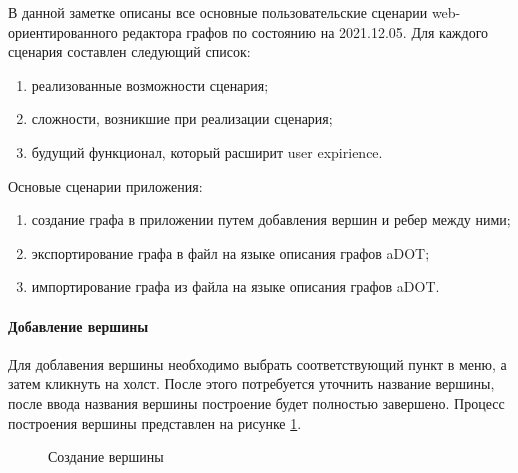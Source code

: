 \def\notedate{2021.12.05}
\def\currentauthor{Ершов В. (РК6-72Б)}

В данной заметке описаны все основные пользовательские сценарии web-ориентированного редактора графов по состоянию на 2021.12.05. Для каждого сценария составлен следующий список:
\begin{enumerate}[label=\arabic*)]
	\item реализованные возможности сценария;
	\item сложности, возникшие при реализации сценария;
	\item будущий функционал, который расширит user expirience.
\end{enumerate}

Основые сценарии приложения:
\begin{enumerate}[label=\arabic*)]
	\item создание графа в приложении путем добавления вершин и ребер между ними;
	\item экспортирование графа в файл на языке описания графов aDOT;
	\item импортирование графа из файла на языке описания графов aDOT.
\end{enumerate}

\paragraph{Добавление вершины}

Для доблавения вершины необходимо выбрать соответствующий пункт в меню, а затем кликнуть на холст.
После этого потребуется уточнить название вершины, после ввода названия вершины построение будет полностью завершено. Процесс построения вершины представлен на рисунке \ref{fig:vertex_create_1}.

\begin{figure}[ht!]
\caption{Создание вершины}\label{fig:vertex_create_1}
\end{figure}


